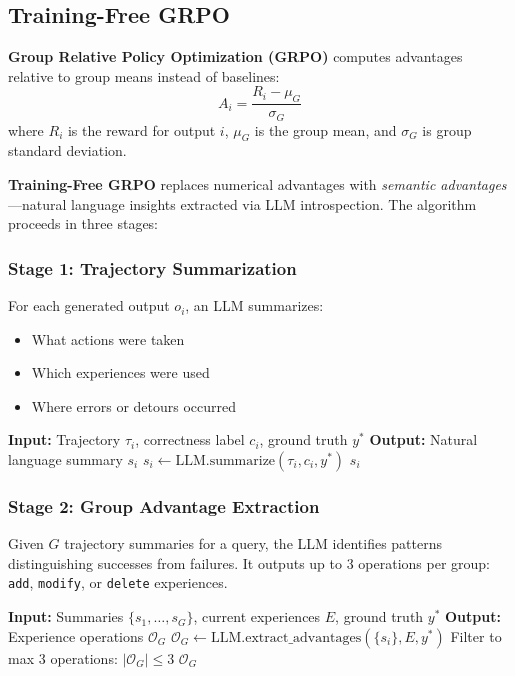 \documentclass[11pt,a4paper]{article}
\begin{document}
\subsection{Training-Free GRPO}

\textbf{Group Relative Policy Optimization (GRPO)} \cite{shao2024deepseekmath} computes advantages relative to group means instead of baselines:
\[
A_i = \frac{R_i - \mu_G}{\sigma_G}
\]
where $R_i$ is the reward for output $i$, $\mu_G$ is the group mean, and $\sigma_G$ is group standard deviation.

\textbf{Training-Free GRPO} \cite{tencent2025grpo} replaces numerical advantages with \textit{semantic advantages}—natural language insights extracted via LLM introspection. The algorithm proceeds in three stages:

\subsubsection{Stage 1: Trajectory Summarization}

For each generated output $o_i$, an LLM summarizes:
\begin{itemize}
\item What actions were taken
\item Which experiences were used
\item Where errors or detours occurred
\end{itemize}

\begin{algorithm}[H]
\caption{Trajectory Summarization}
\begin{algorithmic}[1]
\STATE \textbf{Input:} Trajectory $\tau_i$, correctness label $c_i$, ground truth $y^*$
\STATE \textbf{Output:} Natural language summary $s_i$
\STATE $s_i \leftarrow \text{LLM.summarize}(\tau_i, c_i, y^*)$
\RETURN $s_i$
\end{algorithmic}
\end{algorithm}

\subsubsection{Stage 2: Group Advantage Extraction}

Given $G$ trajectory summaries for a query, the LLM identifies patterns distinguishing successes from failures. It outputs up to 3 operations per group: \texttt{add}, \texttt{modify}, or \texttt{delete} experiences.

\begin{algorithm}[H]
\caption{Group Advantage Extraction}
\begin{algorithmic}[1]
\STATE \textbf{Input:} Summaries $\{s_1, \ldots, s_G\}$, current experiences $E$, ground truth $y^*$
\STATE \textbf{Output:} Experience operations $\mathcal{O}_G$
\STATE $\mathcal{O}_G \leftarrow \text{LLM.extract\_advantages}(\{s_i\}, E, y^*)$
\STATE Filter to max 3 operations: $|\mathcal{O}_G| \leq 3$
\RETURN $\mathcal{O}_G$
\end{algorithmic}
\end{algorithm}
\end{document}
